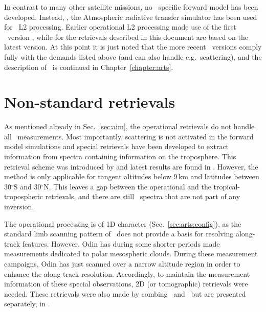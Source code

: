 In contrast to many other satellite missions, no \smr\ specific forward model
has been developed. Instead, \ARTS, the Atmospheric radiative transfer
simulator \citep{buehler:artst:05,eriksson:arts2:11} has been used for \smr\ L2
processing. Earlier operational L2 processing made use of the first \ARTS\
version \citep{urban:odins:05-b}, while for the retrievals described in this
document are based on the latest version. At this point it is just noted that
the more recent \ARTS\ versions comply fully with the demands listed above (and
can also handle e.g.\ scattering), and the description of \ARTS\ is continued in
Chapter~\ref{chapter:arts}.



\section{Non-standard retrievals}
\label{sec:nonstandard}
%
As mentioned already in Sec.~\ref{sec:aim}, the operational retrievals do not
handle all \smr\ measurements. Most importantly, scattering is not activated in
the forward model simulations and special retrievals have been developed to
extract information from spectra containing information on the troposphere.
This retrieval scheme was introduced by \citet{rydberg:nonga:09} and latest
results are found in \citep{eriksson:overw:14}. However, the method
\citet{rydberg:nonga:09} is only applicable for tangent altitudes below 9\,km
and latitudes between 30$^\circ$S and 30$^\circ$N. This leaves a gap between
the operational and the tropical-tropospheric retrievals, and there are
still \smr\ spectra that are not part of any inversion. 

The operational processing is of 1D character (Sec.~\ref{sec:arts:config}), as
the standard limb scanning pattern of \smr\ does not provide a basis for
resolving along-track features. However, Odin has during some shorter periods
made measurements dedicated to polar mesospheric clouds. During these
measurement campaigns, Odin has just scanned over a narrow altitude region in
order to enhance the along-track resolution. Accordingly, to maintain the
measurement information of these special observations, 2D (or tomographic)
retrievals were needed. These retrievals were also made by combing \OEM\ and
\ARTS\ but are presented separately, in \citet{christensen:tomog:15}.










